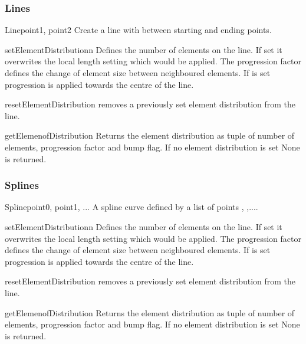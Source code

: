 \subsubsection{Lines}
\begin{classdesc}{Line}{point1, point2}
Create a line with between starting and ending points.
\end{classdesc}
\begin{methoddesc}[Line]{setElementDistribution}{n}
Defines the number of elements on the line. If set it overwrites the local length setting which would be applied. The progression factor  defines the change of element size between neighboured elements. If  is set
progression is applied towards the centre of the line.
\end{methoddesc}
\begin{methoddesc}[Line]{resetElementDistribution}{}
removes a previously set element distribution from the line.
\end{methoddesc}
\begin{methoddesc}[Line]{getElemenofDistribution}{}
Returns the element distribution as tuple of
number of elements, progression factor and bump flag. If
no element distribution is set None is returned.
\end{methoddesc}

\subsubsection{Splines}
\begin{classdesc}{Spline}{point0, point1, ...}
A spline curve defined by a list of points , ,....
\end{classdesc}
\begin{methoddesc}[Spline]{setElementDistribution}{n}
Defines the number of elements on the line. If set it overwrites the local length setting which would be applied. The progression factor  defines the change of element size between neighboured elements. If  is set
progression is applied towards the centre of the line.
\end{methoddesc}
\begin{methoddesc}[Spline]{resetElementDistribution}{}
removes a previously set element distribution from the line.
\end{methoddesc}
\begin{methoddesc}[Spline]{getElemenofDistribution}{}
Returns the element distribution as tuple of
number of elements, progression factor and bump flag. If
no element distribution is set None is returned.
\end{methoddesc}

